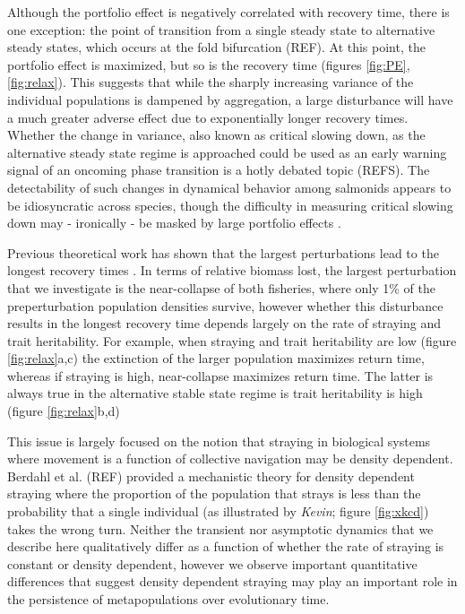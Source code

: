 \documentclass[twocolumn,preprintnumbers,amsmath,amssymb,superscriptaddress]{revtex4}
\begin{document}
Although the portfolio effect is negatively correlated with recovery time, there is one exception: the point of transition from a single steady state to alternative steady states, which occurs at the fold bifurcation (REF).
At this point, the portfolio effect is maximized, but so is the recovery time (figures \ref{fig:PE}, \ref{fig:relax}).
This suggests that while the sharply increasing variance of the individual populations is dampened by aggregation, a large disturbance will have a much greater adverse effect due to exponentially longer recovery times.
Whether the change in variance, also known as critical slowing down, as the alternative steady state regime is approached could be used as an early warning signal of an oncoming phase transition is a hotly debated topic (REFS).
The detectability of such changes in dynamical behavior among salmonids appears to be idiosyncratic across species, though the difficulty in measuring critical slowing down may - ironically - be masked by large portfolio effects \cite{Krkosek:2014ch}.

Previous theoretical work has shown that the largest perturbations lead to the longest recovery times \cite{Ovaskainen:2002il}.
In terms of relative biomass lost, the largest perturbation that we investigate is the near-collapse of both fisheries, where only 1\% of the preperturbation population densities survive, however whether this disturbance results in the longest recovery time depends largely on the rate of straying and trait heritability.
For example, when straying and trait heritability are low (figure \ref{fig:relax}a,c) the extinction of the larger population maximizes return time, whereas if straying is high, near-collapse maximizes return time.
The latter is always true in the alternative stable state regime is trait heritability is high (figure \ref{fig:relax}b,d)


This issue is largely focused on the notion that straying in biological systems where movement is a function of collective navigation may be density dependent.
Berdahl et al. (REF) provided a mechanistic theory for density dependent straying where the proportion of the population that strays is less than the probability that a single individual (as illustrated by \emph{Kevin}; figure \ref{fig:xkcd}) takes the wrong turn.
Neither the transient nor asymptotic dynamics that we describe here qualitatively differ as a function of whether the rate of straying is constant or density dependent, however we observe important quantitative differences that suggest density dependent straying may play an important role in the persistence of metapopulations over evolutionary time.
\end{document}
